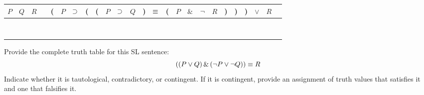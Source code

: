 \begin{tabular}{@{ }c@{ }@{ }c@{ }@{ }c | c@{ }@{}c@{}@{ }c@{ }@{ }c@{ }@{}c@{}@{}c@{}@{ }c@{ }@{ }c@{ }@{ }c@{ }@{}c@{}@{ }c@{ }@{}c@{}@{ }c@{ }@{ }c@{ }@{ }c@{ }@{ }c@{ }@{}c@{}@{}c@{}@{}c@{}@{ }c@{ }@{ }c@{ }@{ }c}
$P$ & $Q$ & $R$ &  & ( & $P$ & $\supset $ & ( & ( & $P$ & $\supset $ & $Q$ & ) & $\equiv $ & ( & $P$ & $\&$ & $\neg$ & $R$ & ) & ) & ) & $\lor$ & $R$ & \\
\hline 
 &  &  &  &  &  &  &  &  &  &  &  &  &  &  &  &  &  &  &  &  &  &  & & \\
 &  &  &  &  &  &  &  &  &  &  &  &  &  &  &  &  &  &  &  &  &  &  & & \\
  &  &  &  &  &  &  &  &  &  &  &  &  &  &  &  &  &  &  &  &  &  &  & & \\
 &  &  &  &  &  &  &  &  &  &  &  &  &  &  &  &  &  &  &  &  &  &  & & \\
 &  &  &  &  &  &  &  &  &  &  &  &  &  &  &  &  &  &  &  &  &  &  & & \\
  &  &  &  &  &  &  &  &  &  &  &  &  &  &  &  &  &  &  &  &  &  &  & & \\
 &  &  &  &  &  &  &  &  &  &  &  &  &  &  &  &  &  &  &  &  &  &  & & \\
  &  &  &  &  &  &  &  &  &  &  &  &  &  &  &  &  &  &  &  &  &  &  & & \\
\end{tabular}




\problempart
\label{HW3.A}
Provide the complete truth table for this SL sentence:
$$((P \vee Q) \,\&\, (\neg P \vee \neg Q)) \equiv R$$
Indicate whether it is tautological, contradictory, or contingent. If it is contingent, provide an assignment of truth values that satisfies it and one that falsifies it.



